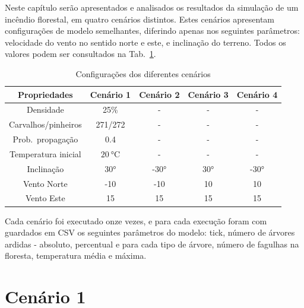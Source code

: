 Neste capítulo serão apresentados e analisados os resultados da simulação de um incêndio florestal, em quatro cenários distintos.
Estes cenários apresentam configurações de modelo semelhantes, diferindo apenas nos seguintes parâmetros: velocidade do vento no sentido norte e este, e inclinação do terreno.
Todos os valores podem ser consultados na Tab.~\ref{tab:scenarios}.

\begin{table}[tbhp]
    \centering
    \begin{tabular}{c|cccc}
        \hline
        \textbf{Propriedades} & \textbf{Cenário 1}        & \textbf{Cenário 2} & \textbf{Cenário 3} & \textbf{Cenário 4} \\
        \hline
        Densidade             & 25\%                      & -                  & -                  & -                  \\
        Carvalhos/pinheiros   & 271/272                   & -                  & -                  & -                  \\
        Prob.\ propagação     & 0.4                       & -                  & -                  & -                  \\
        Temperatura inicial   & $\SI{20}{\degreeCelsius}$ & -                  & -                  & -                  \\
        Inclinação & \ang{30}                  & \ang{-30}          & \ang{30}           & \ang{-30}          \\
        Vento Norte           & -10                       & -10                & 10                 & 10                 \\
        Vento Este            & 15                        & 15                 & 15 & 15                 \\
        \hline
    \end{tabular}
    \caption{Configurações dos diferentes cenários}
    \label{tab:scenarios}
\end{table}

Cada cenário foi executado onze vezes, e para cada execução foram com guardados em CSV os seguintes parâmetros do modelo: tick, número de árvores ardidas - absoluto, percentual e para cada tipo de árvore, número de fagulhas na floresta, temperatura média e máxima.


\section{Cenário 1}\label{sec:scenario1}

